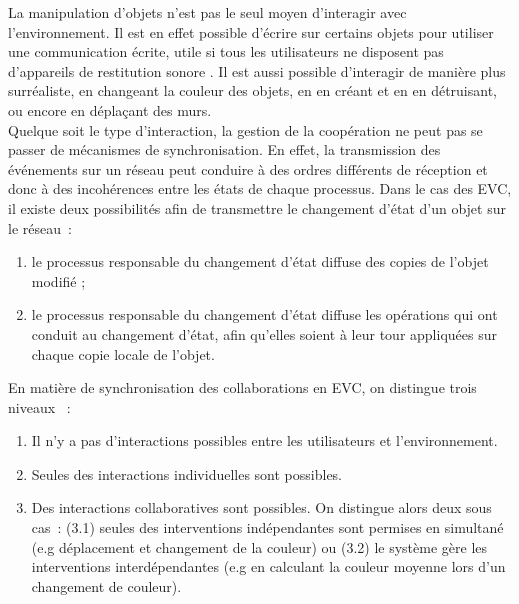\documentclass[11pt]{article}
\begin{document}
La manipulation d'objets n'est pas le seul moyen d'interagir  avec l'environnement. Il est en effet possible d'écrire sur certains objets pour utiliser une communication écrite, utile si tous les utilisateurs ne disposent pas d'appareils de restitution sonore \cite{survey}. Il est aussi possible d'interagir de manière plus surréaliste, en changeant la couleur des objets, en en créant et en en détruisant, ou encore en déplaçant des murs.
\\

Quelque soit le type d'interaction, la gestion de la coopération ne peut pas se passer de mécanismes de synchronisation. En effet, la transmission des événements sur un réseau peut conduire à des ordres différents de réception et donc à des incohérences entre les états de chaque processus. Dans le cas des EVC, il existe deux possibilités afin de transmettre le changement d'état d'un objet sur le réseau~:
\begin{enumerate}
	\item le processus responsable du changement d'état diffuse des copies de l'objet modifié ;
	\item le processus responsable du changement d'état diffuse les opérations qui ont conduit au changement d'état, afin qu'elles soient à leur tour appliquées sur chaque copie locale de l'objet.
\end{enumerate}

En matière de synchronisation des collaborations en EVC, on distingue trois niveaux \cite{margery}~:
\begin{enumerate}
	\item Il n'y a pas d'interactions possibles entre les utilisateurs et l'environnement.
	\item Seules des interactions individuelles sont possibles.
	\item Des interactions collaboratives sont possibles. On distingue alors deux sous cas~: (3.1) seules des interventions indépendantes sont permises en simultané (e.g déplacement et changement de la couleur) ou (3.2) le système gère les interventions interdépendantes (e.g en calculant la couleur moyenne lors d'un changement de couleur).
\end{enumerate}
\end{document}
